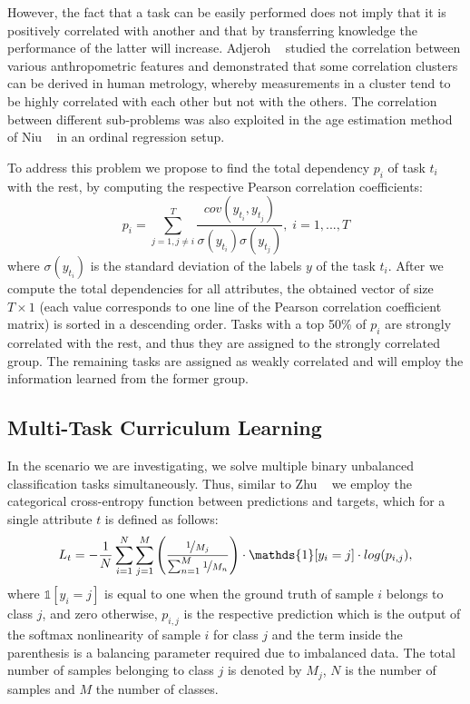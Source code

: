 \documentclass[10pt,twocolumn,letterpaper]{article}
\begin{document}
	However, the fact that a task can be easily performed does not imply that it is  positively correlated with another and that by transferring knowledge the performance of the latter will increase. Adjeroh \etal~\cite{D_2010_11241} studied the correlation between various anthropometric features and demonstrated that some correlation clusters can be derived in human metrology, whereby measurements in a cluster tend to be highly correlated with each other but not with the others. The correlation between different sub-problems was also exploited in the age estimation method of Niu \etal~\cite{Niu_2016_CVPR} in an ordinal regression setup. 
		
	To address this problem we propose to find the total dependency \(p_{i}\) of task \(t_{i}\) with the rest, by computing the respective Pearson correlation coefficients:  
	\begin{equation} \label{eu_eqnP}
	p_{i} =\sum_{j=1, j\neq i}^{T} \frac{cov(y_{t_{i}},y_{t_{j}})}{\sigma(y_{{t_{i}}})\sigma(y_{{t_{j}}})}, \; i=1,...,T
	\end{equation}
	where \(\sigma(y_{{t_{i}}})\) is the standard deviation of the labels \(y\) of the task \(t_{i}\). After we compute the total dependencies for all attributes, the obtained vector of size \(T \times 1\) (each value corresponds to one line of the Pearson correlation coefficient matrix) is sorted in a descending order. 
	Tasks with a top 50\% of \(p_i\) are strongly correlated with the rest, and thus they are assigned to the strongly correlated group. The remaining tasks are assigned as weakly correlated and will employ the information learned from the former group.  
	
	\subsection{Multi-Task Curriculum Learning}
	In the scenario we are investigating, we solve multiple binary unbalanced classification tasks simultaneously. Thus, similar to Zhu \etal~\cite{zhu2016multi} we employ the categorical cross-entropy function between predictions and targets, which for a single attribute \(t\) is defined as follows: 
	\begin{equation} \label{eu_eqn1}
	L_t = -\frac{1}{N}\sum_{i=1}^{N}\sum_{j=1}^{M} \Bigg( \frac{\nicefrac{1}{M_j}}{\sum_{n=1}^{M}\nicefrac{1}{M_n}}\Bigg)\cdot \mathds{1}[y_{i}=j] \cdot log(p_{i,j}),
	\end{equation}
	where \(\mathds{1}[y_{i}=j]\) is equal to one when the ground truth of sample \(i\) belongs to class \(j\), and zero otherwise, \(p_{i,j}\) is the respective prediction which is the output of the softmax nonlinearity of sample \(i\) for class \(j\) and the term inside the parenthesis is a balancing parameter required due to imbalanced data. The total number of samples belonging to class \(j\) is denoted by \(M_j\), \(N\) is the number of samples and \(M\) the number of classes. 
	
\end{document}
